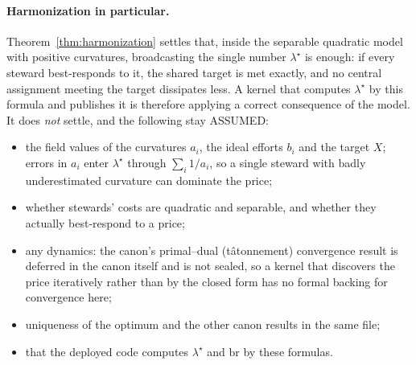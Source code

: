 \documentclass[11pt]{article}
\theoremstyle{definition}
\theoremstyle{remark}
\begin{document}
\paragraph{Harmonization in particular.} Theorem~\ref{thm:harmonization} settles that, inside the separable quadratic model
with positive curvatures, broadcasting the single number $\lambda^\star$ is enough: if every steward best-responds to it, the
shared target is met exactly, and no central assignment meeting the target dissipates less. A kernel that computes $\lambda^\star$
by this formula and publishes it is therefore applying a correct consequence of the model.
It does \emph{not} settle, and the following stay ASSUMED:
\begin{itemize}
\item the field values of the curvatures $a_i$, the ideal efforts $b_i$ and the target $X$; errors in $a_i$ enter $\lambda^\star$
through $\sum_i 1/a_i$, so a single steward with badly underestimated curvature can dominate the price;
\item whether stewards' costs are quadratic and separable, and whether they actually best-respond to a price;
\item any dynamics: the canon's primal--dual (t\^atonnement) convergence result is deferred in the canon itself and is not sealed,
so a kernel that discovers the price iteratively rather than by the closed form has no formal backing for convergence here;
\item uniqueness of the optimum and the other canon results in the same file;
\item that the deployed code computes $\lambda^\star$ and $\mathrm{br}$ by these formulas.
\end{itemize}
\end{document}
